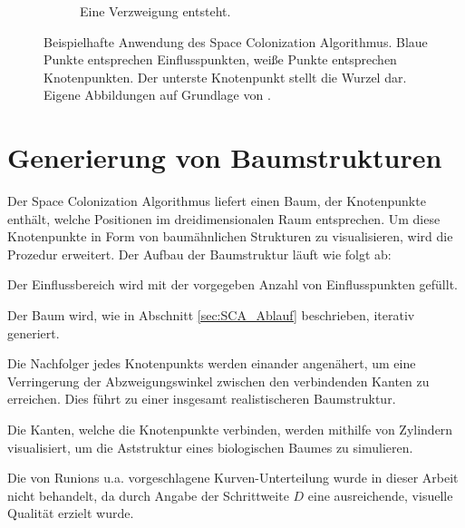 \begin{figure} [hbtp]
\begin{subfigure}[t]{.31\textwidth}
		\caption{Eine Verzweigung entsteht.}
		\label{subfig:SCA_Basic8}
	\end{subfigure}
	\caption{Beispielhafte Anwendung des Space Colonization Algorithmus. Blaue Punkte entsprechen Einflusspunkten, weiße Punkte entsprechen Knotenpunkten. Der unterste Knotenpunkt stellt die Wurzel dar. Eigene Abbildungen auf Grundlage von \cite[Abb. 2]{SpaceColonizationAlgorithm:07}.}\label{fig:SCA_Basic}
	
\end{figure}


\section{Generierung von Baumstrukturen}
\label{sec:GenerierungBaumstrukturen}
Der Space Colonization Algorithmus liefert einen Baum, der Knotenpunkte enthält, welche Positionen im dreidimensionalen Raum entsprechen. Um diese Knotenpunkte in Form von baumähnlichen Strukturen zu visualisieren, wird die Prozedur erweitert. Der Aufbau der Baumstruktur läuft wie folgt ab:

\begin{description}[labelindent]
	\item[\boldmath$1.$] Der Einflussbereich wird mit der vorgegeben Anzahl von Einflusspunkten gefüllt. \cite[S.2]{SpaceColonizationAlgorithm:07} \\

	\item[\boldmath$2.$] Der Baum wird, wie in Abschnitt \ref{sec:SCA_Ablauf} beschrieben, iterativ generiert. \cite[S.2]{SpaceColonizationAlgorithm:07} \\

	\item[\boldmath$3.$] Die Nachfolger jedes Knotenpunkts werden einander angenähert, um eine Verringerung der Abzweigungswinkel zwischen den verbindenden Kanten zu erreichen. Dies führt zu einer insgesamt realistischeren Baumstruktur. \cite[S.2]{SpaceColonizationAlgorithm:07} \\
	
	\item[\boldmath$4.$] Die Kanten, welche die Knotenpunkte verbinden, werden mithilfe von Zylindern visualisiert, um die Aststruktur eines biologischen Baumes zu simulieren. \cite[S.2]{SpaceColonizationAlgorithm:07} 
	
\end{description}

Die von Runions u.a. \cite{SpaceColonizationAlgorithm:07} vorgeschlagene Kurven-Unterteilung \cite[S.2]{SpaceColonizationAlgorithm:07} wurde in dieser Arbeit nicht behandelt, da durch Angabe der Schrittweite $D$ eine ausreichende, visuelle Qualität erzielt wurde.

